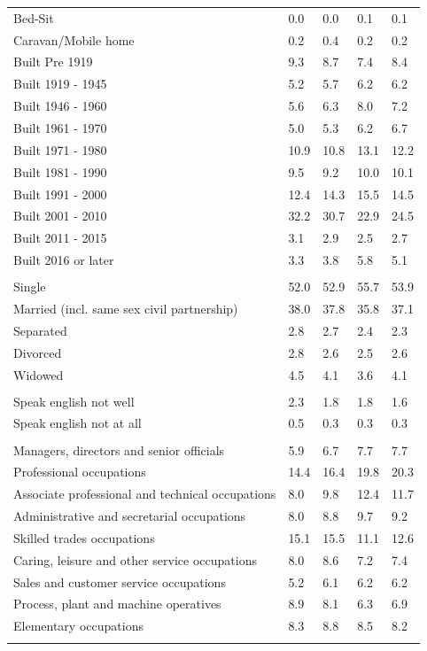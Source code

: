\documentclass{article}
\begin{document}
\begin{table}[h]
\begin{tabular}{KTTTT}
Bed-Sit & 0.0& 0.0& 0.1& 0.1\\
Caravan/Mobile home & 0.2& 0.4& 0.2& 0.2\\
    \hline
Built Pre 1919 & 9.3& 8.7& 7.4& 8.4\\
Built 1919 - 1945 & 5.2& 5.7& 6.2& 6.2\\
Built  1946 - 1960 & 5.6& 6.3& 8.0& 7.2\\
Built  1961 - 1970 & 5.0& 5.3& 6.2& 6.7\\
Built  1971 - 1980 & 10.9& 10.8& 13.1& 12.2\\
Built  1981 - 1990 &  9.5&  9.2& 10.0& 10.1\\
Built  1991 - 2000 & 12.4& 14.3& 15.5& 14.5\\
Built  2001 - 2010 & 32.2& 30.7& 22.9& 24.5\\
Built  2011 - 2015 & 3.1& 2.9& 2.5& 2.7\\
Built  2016 or later & 3.3& 3.8& 5.8& 5.1\\
\hline
    \\
    \hline
Single & 52.0& 52.9& 55.7& 53.9\\
Married (incl. same sex civil partnership) & 38.0& 37.8& 35.8& 37.1\\
Separated  & 2.8& 2.7& 2.4& 2.3\\
Divorced  & 2.8& 2.6& 2.5& 2.6\\
Widowed & 4.5& 4.1& 3.6& 4.1\\
\hline
    \\ 
    \hline
Speak english not well & 2.3& 1.8& 1.8& 1.6\\
Speak english not at all & 0.5& 0.3& 0.3& 0.3\\
\hline
    \\
    \hline
Managers, directors and senior officials & 5.9& 6.7& 7.7& 7.7\\
Professional occupations & 14.4& 16.4& 19.8& 20.3\\
Associate professional and technical occupations &  8.0&  9.8& 12.4& 11.7\\
Administrative and secretarial occupations & 8.0& 8.8& 9.7& 9.2\\
Skilled trades occupations & 15.1& 15.5& 11.1& 12.6\\
Caring, leisure and other service occupations & 8.0& 8.6& 7.2& 7.4\\
Sales and customer service occupations & 5.2& 6.1& 6.2& 6.2\\
Process, plant and machine operatives & 8.9& 8.1& 6.3& 6.9\\
Elementary occupations & 8.3& 8.8& 8.5& 8.2\\
\hline
\end{tabular}
\end{table}
\end{document}
